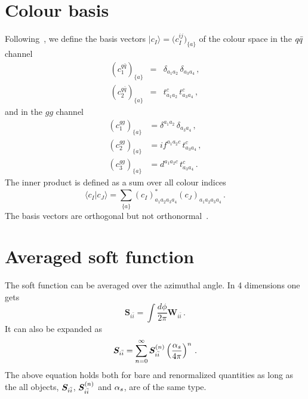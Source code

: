 \documentclass[a4paper,11pt]{report}
\numberwithin{equation}{section}
\newcommand{\bfS}{\bm{S}}
\begin{document}
\section{Colour basis}
\label{sec:colbasis}

Following~\cite{Li:2013mia, Ferroglia:2012uy}, we define the basis
vectors 
$|c_I\rangle = \big(c_I^{ij}\big)_{\{a\}}$ 
of the colour space in the $q{\bar q}$ channel
%
\begin{eqnarray}
  \left(c_1^{q\bar{q}}\right)_{\{a\}} & = & \delta_{a_1a_2} \,\delta_{a_3a_4}\,,
  \\
  \left(c_2^{q\bar{q}}\right)_{\{a\}} & = & t_{a_1a_2}^c \, t_{a_3a_4}^c\,,
\end{eqnarray}
%
and in the $gg$ channel
%
\begin{subequations}
  \begin{align}
    \left(c_1^{gg}\right)_{\{a\}} & = \delta^{a_1a_2} \, \delta_{a_3a_4} \, , 
    \\
    \left(c_2^{gg}\right)_{\{a\}} & = i f^{a_1a_2c} \, t^{c}_{a_3a_4} \, , 
    \\
    \left(c_3^{gg}\right)_{\{a\}} & = d^{a_1 a_2 c} \, t^c_{a_3a_4} \, .
  \end{align}
  \label{eq:colour-basis-gg}
\end{subequations}
%
The inner product is defined as a sum over all colour indices
%
\begin{equation}
  \langle c_I | c_J \rangle = 
  \sum_{\{a\}} 
  \left( c_I \right)^*_{a_1 a_2 a_3 a_4}
  \left( c_J \right)_{a_1 a_2 a_3 a_4}\,.
\end{equation}
%
The basis vectors are orthogonal but not orthonormal~\cite{Ferroglia:2012uy}.

\section{Averaged soft function}

The soft function can be averaged over the azimuthal angle. In 4 dimensions one gets
%
\begin{equation}
  \bfS_{i\bar i} = \int \frac{d\phi}{2\pi} \bm{W}_{i\bar i}\,.
  \label{eq:sf-av4}
\end{equation}
%
It can also be expanded as 
\begin{equation}
  \bfS_{i\bar i} = 
  \sum_{n=0}^\infty \bfS_{i\bar i}^{(n)} \left(\asp\right)^n\,.
\end{equation}
The above equation holds both for bare and renormalized quantities as long as
the all objects, \ie $\bfS_{\iibar}$, $\bfS_{\iibar}^{(n)}$ and ${\alpha_s}$,  are of
the same type.
\end{document}
